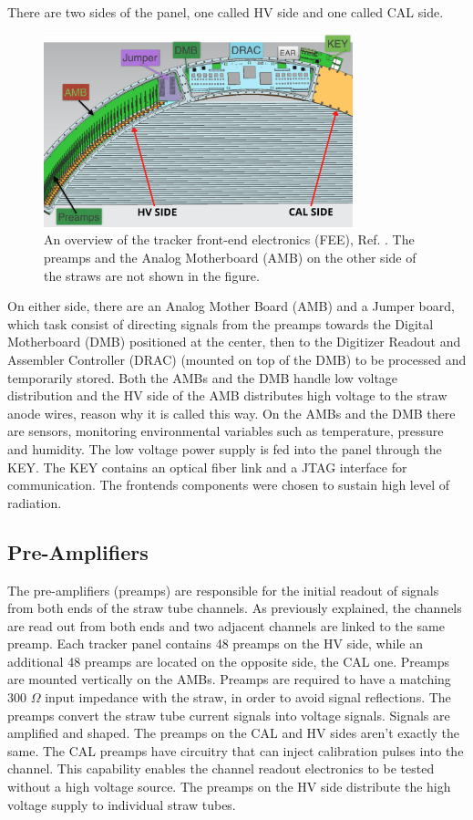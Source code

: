 There are two sides of the panel, one called HV side and one called CAL side. 
\begin{figure}[!h]
\centering
\includegraphics[width =0.8\textwidth]{figures/png/Screenshot_20240131_111836.png}
\caption{An overview of the tracker front-end electronics (FEE), Ref.  
\cite{vadimmu2e}. The preamps and the Analog Motherboard (AMB) 
on the other side of the straws are not shown in the figure.}
\label{fig:trackerfee}
\end{figure}
On either side, there are an Analog Mother Board (AMB) and a Jumper board, 
which task consist of directing signals from the preamps towards the Digital 
Motherboard (DMB) positioned at the center, then to the Digitizer Readout and 
Assembler Controller (DRAC) (mounted on top of the DMB) to be processed and 
temporarily stored. Both the AMBs and the DMB handle low voltage distribution 
and the HV side of the AMB distributes high voltage to the straw anode wires, 
reason why it is called this way. On the AMBs and the DMB there are sensors, 
monitoring environmental variables such as temperature, pressure and humidity. 
The low voltage power supply is fed into the panel through the KEY. The KEY 
contains an optical fiber link and a JTAG interface for communication. The 
frontends components were chosen to sustain high level of radiation.
\subsection{Pre-Amplifiers}
The pre-amplifiers (preamps) are responsible for the initial readout of 
signals from both ends of the straw tube channels. As previously explained, 
the channels are read out from both ends and two adjacent channels are linked 
to the same preamp. Each tracker panel contains 48 preamps on the HV side, 
while an additional 48 preamps are located on the opposite side, the CAL one. 
Preamps are mounted vertically on the AMBs. Preamps are required to have a 
matching 300 $\Omega$ input impedance with the straw, in order to avoid signal 
reflections. The preamps convert the straw tube current signals into voltage signals. 
Signals are amplified and shaped. The preamps on the CAL and HV sides aren't 
exactly the same. The CAL preamps have circuitry that can inject calibration 
pulses into the channel. This capability enables the channel readout electronics 
to be tested without a high voltage source. The preamps on the HV side distribute 
the high voltage supply to individual straw tubes. 
